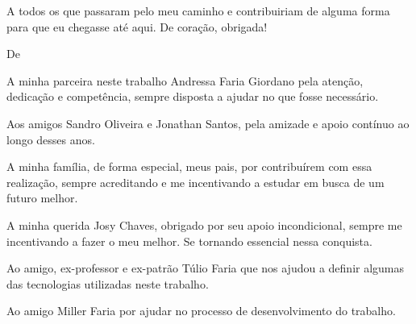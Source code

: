 \begin{agradecimentos}
\par A todos os que passaram pelo meu caminho e contribuiriam de alguma forma para que eu chegasse até aqui. De coração, obrigada!


\vspace*{\fill}
De \imprimirAutorDois
\newline
\par A minha parceira neste trabalho Andressa Faria Giordano pela atenção, dedicação e competência, sempre disposta a ajudar no que fosse necessário.

\par Aos amigos Sandro Oliveira e Jonathan Santos, pela amizade e apoio contínuo ao longo desses anos.

\par A minha família, de forma especial, meus pais, por contribuírem com essa realização, sempre acreditando e me incentivando a estudar em busca de um futuro melhor.

\par A minha querida Josy Chaves, obrigado por seu apoio incondicional, sempre me incentivando a fazer o meu melhor. Se tornando essencial nessa conquista.

\par Ao amigo, ex-professor e ex-patrão Túlio Faria que nos ajudou a definir algumas das tecnologias utilizadas neste trabalho.

\par Ao amigo Miller Faria por ajudar no processo de desenvolvimento do trabalho.

\end{agradecimentos}




